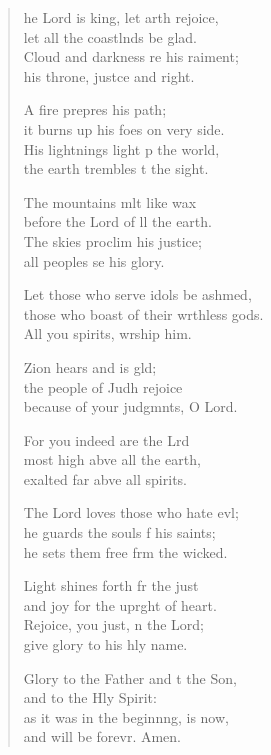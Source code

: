 \begin{verse}
  \begin{patverse}
    he Lord is king, let arth rejoice,\Med\\
let all the coastlnds be glad.\\
Cloud and darkness re his raiment;\Med\\
his throne, just\pointup{\i}ce and right.

A fire prepres his path;\Med\\
it burns up his foes on very side.\\
His lightnings light p the world,\Med\\
the earth trembles t the sight.

The mountains mlt like wax\Med\\
before the Lord of ll the earth.\\
The skies proclim his justice;\Med\\
all peoples se his glory.

Let those who serve idols be ashmed,\Flex\\
those who boast of their wrthless gods.\Med\\
All you spirits, wrship him.

Zion hears and is gld;\Flex\\
the people of Judh rejoice\Med\\
because of your judgmnts, O Lord.

For you indeed are the Lrd\Flex\\
most high abve all the earth,\Med\\
exalted far abve all spirits.

The Lord loves those who hate ev\pointup{\i}l;\Flex\\
he guards the souls f his saints;\Med\\
he sets them free frm the wicked.

Light shines forth fr the just\Med\\
and joy for the upr\pointup{\i}ght of heart.\\
Rejoice, you just, \pointup{\i}n the Lord;\Med\\
give glory to his hly name.

Glory to the Father and t the Son,\Med\\
and to the Hly Spirit:\\
as it was in the beginn\pointup{\i}ng, is now,\Med\\
and will be forevr. Amen.
  \end{patverse}
\end{verse}
